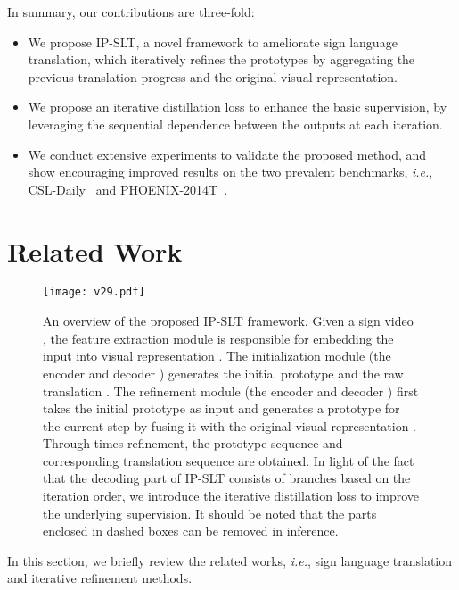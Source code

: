 \documentclass[10pt,twocolumn,letterpaper]{article}
\begin{document}
In summary, our contributions are three-fold:
\begin{itemize}
\item[] We propose IP-SLT, a novel framework to ameliorate sign language translation, which iteratively refines the prototypes by aggregating the previous translation progress and the original visual representation.
\end{itemize}
\begin{itemize}
\item[] We propose an iterative distillation loss to enhance the basic supervision, by leveraging the sequential dependence between the outputs at each iteration.
\end{itemize}
\begin{itemize}
\item[] 
We conduct extensive experiments to validate the proposed method, and show encouraging improved results on the two prevalent benchmarks, \emph{i.e.}, CSL-Daily~\cite{zhou2021improving} and PHOENIX-2014T~\cite{camgoz2018neural}.
\end{itemize}

\section{Related Work}

\begin{figure*}
\centering
\texttt{[image: v29.pdf]}
\caption{An overview of the proposed IP-SLT framework. Given a sign video , the feature extraction module is responsible for embedding the input into visual representation . The initialization module (the encoder  and decoder ) generates the initial prototype  and the raw translation . The refinement module (the encoder  and decoder ) first takes the initial prototype  as input and generates a prototype for the current step by fusing it with the original visual representation . Through  times refinement, the prototype sequence  and corresponding translation sequence  are obtained.
In light of the fact that the decoding part of IP-SLT consists of  branches based on the iteration order, we introduce the iterative distillation loss to improve the underlying supervision. It should be noted that the parts enclosed in dashed boxes can be removed in inference.
}
\label{fig2}
\end{figure*}
In this section, we briefly review the related works, \emph{i.e.}, sign language translation and iterative refinement methods.
\end{document}
